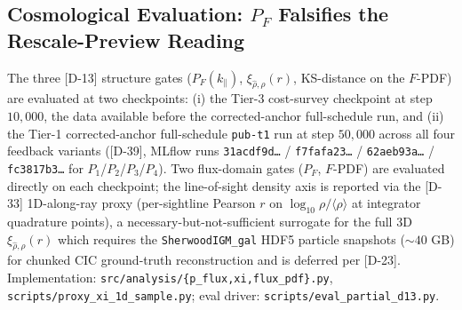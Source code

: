 \subsection{Cosmological Evaluation: $P_F$ Falsifies the Rescale-Preview Reading}
\label{sec:experiments:cosmological-eval}
The three [D-13] structure gates ($P_F(k_\parallel)$, $\xi_{\hat\rho,\rho}(r)$, KS-distance on the $F$-PDF) are evaluated at two checkpoints: (i) the Tier-3 cost-survey checkpoint at step $10{,}000$, the data available before the corrected-anchor full-schedule run, and (ii) the Tier-1 corrected-anchor full-schedule \texttt{pub-t1} run at step $50{,}000$ across all four feedback variants ([D-39], MLflow runs \texttt{31acdf9d\dots} / \texttt{f7fafa23\dots} / \texttt{62aeb93a\dots} / \texttt{fc3817b3\dots} for $P_1$/$P_2$/$P_3$/$P_4$). Two flux-domain gates ($P_F$, $F$-PDF) are evaluated directly on each checkpoint; the line-of-sight density axis is reported via the [D-33] 1D-along-ray proxy (per-sightline Pearson $r$ on $\log_{10}\rho/\langle\rho\rangle$ at integrator quadrature points), a necessary-but-not-sufficient surrogate for the full 3D $\xi_{\hat\rho,\rho}(r)$ which requires the \texttt{SherwoodIGM\_gal} HDF5 particle snapshots ($\sim 40$ GB) for chunked CIC ground-truth reconstruction and is deferred per [D-23]. Implementation: \texttt{src/analysis/\{p\_flux,xi,flux\_pdf\}.py}, \texttt{scripts/proxy\_xi\_1d\_sample.py}; eval driver: \texttt{scripts/eval\_partial\_d13.py}.

